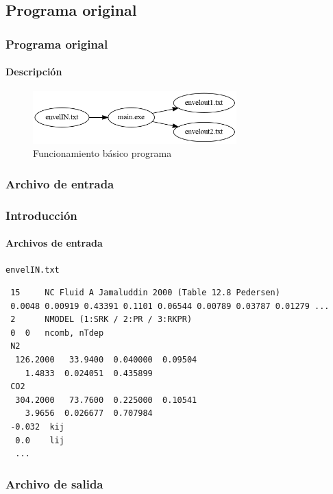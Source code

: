 \documentclass[aspectratio=1610,multi,rgb]{beamer}
\begin{document}
\subsection{Programa original}\label{forprog}
\begin{frame}[c]
    \frametitle{Programa original}
    \framesubtitle{Descripción}
    \begin{figure}[htpb]
        \centering
        \includegraphics[width=0.7\textwidth]{figs/orig.png}
        \caption{Funcionamiento básico programa}
    \end{figure}
\end{frame}

\subsubsection{Archivo de entrada}
\begin{frame}[c, fragile]
    \frametitle{Introducción}
    \framesubtitle{Archivos de entrada}

    \texttt{envelIN.txt}

\begin{lstlisting}
 15     NC Fluid A Jamaluddin 2000 (Table 12.8 Pedersen)
 0.0048 0.00919 0.43391 0.1101 0.06544 0.00789 0.03787 0.01279 ...
 2      NMODEL (1:SRK / 2:PR / 3:RKPR)
 0  0   ncomb, nTdep
 N2  
  126.2000   33.9400  0.040000  0.09504
    1.4833  0.024051  0.435899
 CO2 
  304.2000   73.7600  0.225000  0.10541
    3.9656  0.026677  0.707984
 -0.032  kij
  0.0    lij
  ...
\end{lstlisting}
    
\end{frame}


\subsubsection{Archivo de salida}
\end{document}

